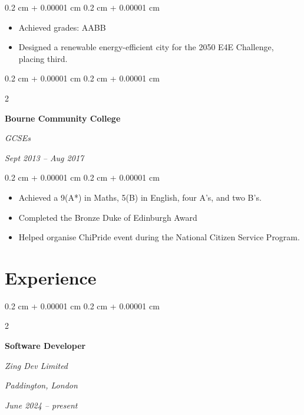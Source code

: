 \documentclass[10pt, letterpaper]{article}
\newenvironment{highlights}{
    \begin{itemize}[
        topsep=0.10 cm,
        parsep=0.10 cm,
        partopsep=0pt,
        itemsep=0pt,
        leftmargin=0.4 cm + 10pt
    ]
}{
    \end{itemize}
} %
\newenvironment{onecolentry}{
    \begin{adjustwidth}{
        0.2 cm + 0.00001 cm
    }{
        0.2 cm + 0.00001 cm
    }
}{
    \end{adjustwidth}
} %
\newenvironment{twocolentry}[2][]{
    \onecolentry
    \def\secondColumn{#2}
    \setcolumnwidth{\fill, 4.5 cm}
    \begin{paracol}{2}
}{
    \switchcolumn \raggedleft \secondColumn
    \end{paracol}
    \endonecolentry
} %
\begin{document}
        \vspace{0.10 cm}
        \begin{onecolentry}
            \begin{highlights}
                \item Achieved grades: AABB
                \item Designed a renewable energy-efficient city for the 2050 E4E Challenge, placing third.
            \end{highlights}
        \end{onecolentry}


        \vspace{0.2 cm}

        \begin{twocolentry}{
            
            
        \textit{Sept 2013 – Aug 2017}}
            \textbf{Bourne Community College}

            \textit{GCSEs}
        \end{twocolentry}

        \vspace{0.10 cm}
        \begin{onecolentry}
            \begin{highlights}
                \item Achieved a 9(A*) in Maths, 5(B) in English, four A's, and two B's.
                \item Completed the Bronze Duke of Edinburgh Award
                \item Helped organise ChiPride event during the National Citizen Service Program.
            \end{highlights}
        \end{onecolentry}



    
    \section{Experience}



        
        \begin{twocolentry}{
        \textit{Paddington, London}    
            
        \textit{June 2024 – present}}
            \textbf{Software Developer}
            
            \textit{Zing Dev Limited}
        \end{twocolentry}
\end{document}
